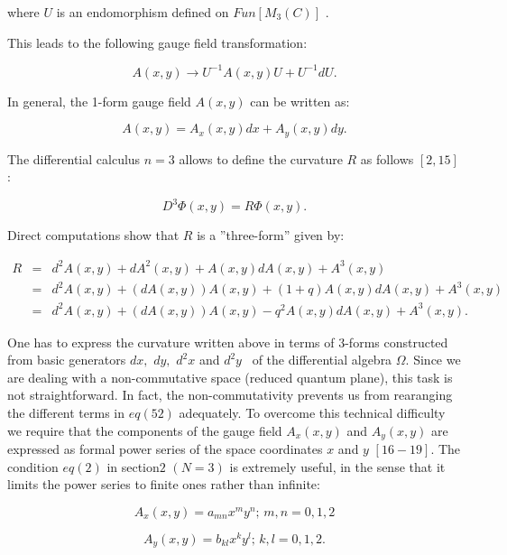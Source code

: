 \documentclass[a4paper,12pt,thmsa]{article}
\begin{document}
where $U$ is an endomorphism defined on $Fun[M_3(C)]$ .

This leads to the following gauge field transformation:

\begin{equation}
A(x,y)\rightarrow U^{-1}A(x,y)U+U^{-1}dU.
\end{equation}

In general, the 1-form gauge field $A(x,y)$ can be written as:

\begin{equation}
A(x,y)=A_{x}(x,y)dx+A_{y}(x,y)dy.
\end{equation}

The differential calculus $n=3$ allows to define the curvature $R$ as
follows $\left[ 2,15\right] $:

\begin{equation}
D^{3}\Phi (x,y)=R\Phi (x,y).
\end{equation}

Direct computations show that $R$ is a ''three-form'' given by:

\begin{eqnarray}
R&=& d^2A(x,y)+dA^2(x,y)+A(x,y)dA(x,y)+A^3(x,y) \\
&=& d^2A(x,y)+(dA(x,y))A(x,y)+(1+q)A(x,y)dA(x,y)+A^3(x,y) \\
&=& d^{2}A(x,y)+(dA(x,y))A(x,y)-q^{2}A(x,y)dA(x,y)+A^{3}(x,y).
\end{eqnarray}

One has to express the curvature written above in terms of $3$-forms
constructed from basic generators $dx,$ $dy,$ $d^2x$ and $d^2y$ \ of the
differential algebra $\Omega .$ Since we are dealing with a non-commutative
space (reduced quantum plane), this task is not straightforward. In fact,
the non-commutativity prevents us from rearanging the different terms in $%
eq(52)$ adequately. To overcome this technical difficulty we require that
the components of the gauge field $A_x(x,y)$ and $A_y(x,y)$ are expressed as
formal power series of the space coordinates $x$ and $y$ $\left[
16-19\right] $. The condition $eq(2)$ in section$2$ $(N=3)$ is extremely
useful, in the sense that it limits the power series to finite ones rather
than infinite:

\begin{equation}
A_{x}(x,y)=a_{mn}x^{m}y^{n};\, m,n=0,1,2
\end{equation}

\begin{equation}
A_y(x,y)=b_{kl}x^ky^l;\, k,l=0,1,2.
\end{equation}
\end{document}
